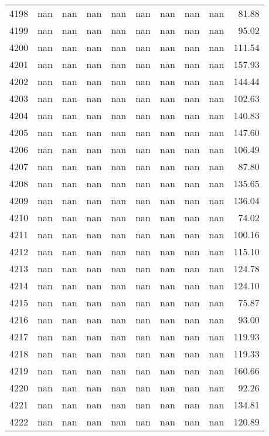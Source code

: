 \begin{tabular}{lrrrrrrrrr}
4198 & nan & nan & nan & nan & nan & nan & nan & nan & 81.88 \\
4199 & nan & nan & nan & nan & nan & nan & nan & nan & 95.02 \\
4200 & nan & nan & nan & nan & nan & nan & nan & nan & 111.54 \\
4201 & nan & nan & nan & nan & nan & nan & nan & nan & 157.93 \\
4202 & nan & nan & nan & nan & nan & nan & nan & nan & 144.44 \\
4203 & nan & nan & nan & nan & nan & nan & nan & nan & 102.63 \\
4204 & nan & nan & nan & nan & nan & nan & nan & nan & 140.83 \\
4205 & nan & nan & nan & nan & nan & nan & nan & nan & 147.60 \\
4206 & nan & nan & nan & nan & nan & nan & nan & nan & 106.49 \\
4207 & nan & nan & nan & nan & nan & nan & nan & nan & 87.80 \\
4208 & nan & nan & nan & nan & nan & nan & nan & nan & 135.65 \\
4209 & nan & nan & nan & nan & nan & nan & nan & nan & 136.04 \\
4210 & nan & nan & nan & nan & nan & nan & nan & nan & 74.02 \\
4211 & nan & nan & nan & nan & nan & nan & nan & nan & 100.16 \\
4212 & nan & nan & nan & nan & nan & nan & nan & nan & 115.10 \\
4213 & nan & nan & nan & nan & nan & nan & nan & nan & 124.78 \\
4214 & nan & nan & nan & nan & nan & nan & nan & nan & 124.10 \\
4215 & nan & nan & nan & nan & nan & nan & nan & nan & 75.87 \\
4216 & nan & nan & nan & nan & nan & nan & nan & nan & 93.00 \\
4217 & nan & nan & nan & nan & nan & nan & nan & nan & 119.93 \\
4218 & nan & nan & nan & nan & nan & nan & nan & nan & 119.33 \\
4219 & nan & nan & nan & nan & nan & nan & nan & nan & 160.66 \\
4220 & nan & nan & nan & nan & nan & nan & nan & nan & 92.26 \\
4221 & nan & nan & nan & nan & nan & nan & nan & nan & 134.81 \\
4222 & nan & nan & nan & nan & nan & nan & nan & nan & 120.89 \\

\end{tabular}

